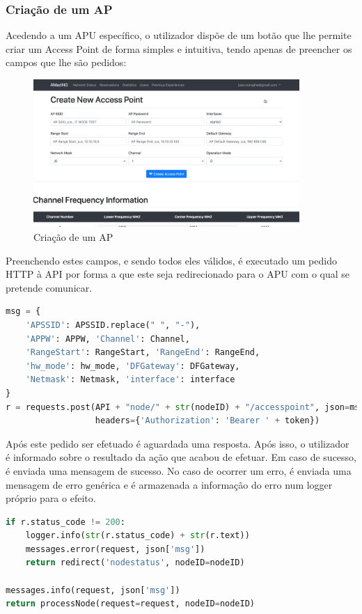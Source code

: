 \subsubsection{Criação de um AP}
Acedendo a um APU específico, o utilizador dispõe de um botão que lhe permite criar um Access Point de forma simples e intuitiva, tendo apenas de preencher os campos que lhe são pedidos:\hfill\break
\newpage
\begin{figure}[!ht]
    \centering
    \includegraphics[width=0.9\textwidth]{images/create_ap.png}
    \caption{Criação de um AP}
    \label{fig:createap}
\end{figure}
\hfill\break
Preenchendo estes campos, e sendo todos eles válidos, é executado um pedido HTTP à API por forma a que este seja redirecionado para o APU com o qual se pretende comunicar.
\begin{lstlisting}[language=python,caption={Criação de um AP},breaklines=true,label={code:createap}]
msg = {
    'APSSID': APSSID.replace(" ", "-"),
    'APPW': APPW, 'Channel': Channel,
    'RangeStart': RangeStart, 'RangeEnd': RangeEnd,
    'hw_mode': hw_mode, 'DFGateway': DFGateway,
    'Netmask': Netmask, 'interface': interface
}
r = requests.post(API + "node/" + str(nodeID) + "/accesspoint", json=msg,
                  headers={'Authorization': 'Bearer ' + token})
\end{lstlisting}
Após este pedido ser efetuado é aguardada uma resposta. Após isso, o utilizador é informado sobre o resultado da ação que acabou de efetuar. Em caso de sucesso, é enviada uma mensagem de sucesso. No caso de ocorrer um erro, é enviada uma mensagem de erro genérica e é armazenada a informação do erro num logger próprio para o efeito.
\begin{lstlisting}[language=python,caption={Resultado da comunicação Frontend - APU},breaklines=true,label={code:createap}]
if r.status_code != 200:
    logger.info(str(r.status_code) + str(r.text))
    messages.error(request, json['msg'])
    return redirect('nodestatus', nodeID=nodeID)

messages.info(request, json['msg'])
return processNode(request=request, nodeID=nodeID)
\end{lstlisting}

